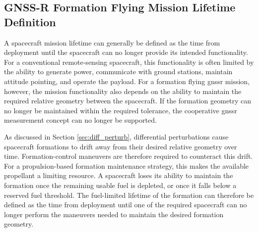 \subsection{GNSS-R Formation Flying Mission Lifetime Definition}
\label{sec:gnssr_mission_lifetime_def}
A spacecraft mission lifetime can generally be defined as the time from deployment until the spacecraft can no longer provide its intended functionality. For a conventional remote-sensing spacecraft, this functionality is often limited by the ability to generate power, communicate with ground stations, maintain attitude pointing, and operate the payload. For a formation flying \gls{gnssr} mission, however, the mission functionality also depends on the ability to maintain the required relative geometry between the spacecraft. If the formation geometry can no longer be maintained within the required tolerance, the cooperative \gls{gnssr} measurement concept can no longer be supported.

As discussed in Section \ref{sec:diff_perturb}, differential perturbations cause spacecraft formations to drift away from their desired relative geometry over time. Formation-control maneuvers are therefore required to counteract this drift. For a propulsion-based formation maintenance strategy, this makes the available propellant a limiting resource. A spacecraft loses its ability to maintain the formation once the remaining usable fuel is depleted, or once it falls below a reserved fuel threshold. The fuel-limited lifetime of the formation can therefore be defined as the time from deployment until one of the required spacecraft can no longer perform the maneuvers needed to maintain the desired formation geometry.

